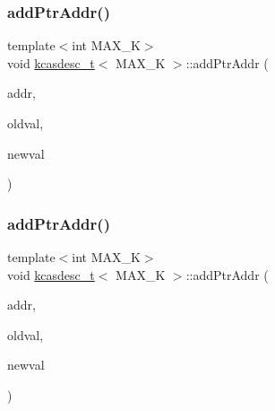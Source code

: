 \subsubsection{\texorpdfstring{add\+Ptr\+Addr()}{addPtrAddr()}\hspace{0.1cm}{\footnotesize\ttfamily [1/2]}}
{\footnotesize\ttfamily template$<$int M\+A\+X\+\_\+K$>$ \\
void \hyperlink{classkcasdesc__t}{kcasdesc\+\_\+t}$<$ M\+A\+X\+\_\+K $>$\+::add\+Ptr\+Addr (\begin{DoxyParamCaption}\item[{\hyperlink{rq__unsafe_8h_ad45142aaf2ff20a036dc6242b8483e9c}{casword\+\_\+t} volatile $\ast$}]{addr,  }\item[{\hyperlink{rq__unsafe_8h_ad45142aaf2ff20a036dc6242b8483e9c}{casword\+\_\+t}}]{oldval,  }\item[{\hyperlink{rq__unsafe_8h_ad45142aaf2ff20a036dc6242b8483e9c}{casword\+\_\+t}}]{newval }\end{DoxyParamCaption})\hspace{0.3cm}{\ttfamily [inline]}}

\mbox{\label{classkcasdesc__t_a42dbc67de7a757f0d4c8262172994498}} 
\subsubsection{\texorpdfstring{add\+Ptr\+Addr()}{addPtrAddr()}\hspace{0.1cm}{\footnotesize\ttfamily [2/2]}}
{\footnotesize\ttfamily template$<$int M\+A\+X\+\_\+K$>$ \\
void \hyperlink{classkcasdesc__t}{kcasdesc\+\_\+t}$<$ M\+A\+X\+\_\+K $>$\+::add\+Ptr\+Addr (\begin{DoxyParamCaption}\item[{\hyperlink{rq__unsafe_8h_ad45142aaf2ff20a036dc6242b8483e9c}{casword\+\_\+t} volatile $\ast$}]{addr,  }\item[{\hyperlink{rq__unsafe_8h_ad45142aaf2ff20a036dc6242b8483e9c}{casword\+\_\+t}}]{oldval,  }\item[{\hyperlink{rq__unsafe_8h_ad45142aaf2ff20a036dc6242b8483e9c}{casword\+\_\+t}}]{newval }\end{DoxyParamCaption})\hspace{0.3cm}{\ttfamily [inline]}}

